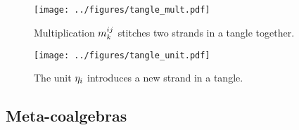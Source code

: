 \documentclass{beamer}
\theoremstyle{theorem}
\begin{document}
\begin{frame}
        \begin{figure}
        \centering
        \texttt{[image: ../figures/tangle\_mult.pdf]}
        \caption{
                Multiplication $m^{ij}_{k}$ stitches two strands in a tangle
                together.
        }
        \label{fig:tangle_mult}
\end{figure}
\end{frame}

\begin{frame}
        \begin{figure}
        \centering
        \texttt{[image: ../figures/tangle\_unit.pdf]}
        \caption{The unit $\eta_i$ introduces a new strand in a tangle.}
        \label{fig:tangle_unit}
\end{figure}
\end{frame}

\subsection{Meta-coalgebras}
\end{document}
